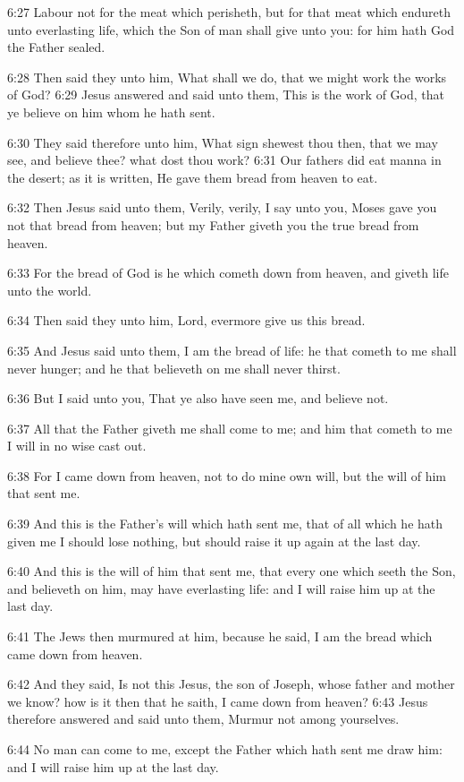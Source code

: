 6:27 Labour not for the meat which perisheth, but for that meat which
endureth unto everlasting life, which the Son of man shall give unto
you: for him hath God the Father sealed.

6:28 Then said they unto him, What shall we do, that we might work the
works of God?  6:29 Jesus answered and said unto them, This is the
work of God, that ye believe on him whom he hath sent.

6:30 They said therefore unto him, What sign shewest thou then, that
we may see, and believe thee? what dost thou work?  6:31 Our fathers
did eat manna in the desert; as it is written, He gave them bread from
heaven to eat.

6:32 Then Jesus said unto them, Verily, verily, I say unto you, Moses
gave you not that bread from heaven; but my Father giveth you the true
bread from heaven.

6:33 For the bread of God is he which cometh down from heaven, and
giveth life unto the world.

6:34 Then said they unto him, Lord, evermore give us this bread.

6:35 And Jesus said unto them, I am the bread of life: he that cometh
to me shall never hunger; and he that believeth on me shall never
thirst.

6:36 But I said unto you, That ye also have seen me, and believe not.

6:37 All that the Father giveth me shall come to me; and him that
cometh to me I will in no wise cast out.

6:38 For I came down from heaven, not to do mine own will, but the
will of him that sent me.

6:39 And this is the Father's will which hath sent me, that of all
which he hath given me I should lose nothing, but should raise it up
again at the last day.

6:40 And this is the will of him that sent me, that every one which
seeth the Son, and believeth on him, may have everlasting life: and I
will raise him up at the last day.

6:41 The Jews then murmured at him, because he said, I am the bread
which came down from heaven.

6:42 And they said, Is not this Jesus, the son of Joseph, whose father
and mother we know? how is it then that he saith, I came down from
heaven?  6:43 Jesus therefore answered and said unto them, Murmur not
among yourselves.

6:44 No man can come to me, except the Father which hath sent me draw
him: and I will raise him up at the last day.

